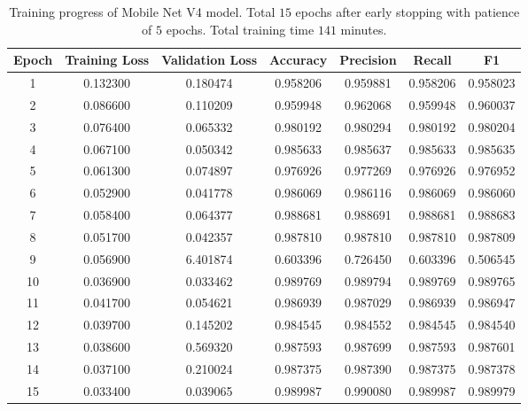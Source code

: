 \documentclass[a4paper]{article}
\begin{document}
\begin{table}[H]
    \centering
    \caption{Training progress of Mobile Net V4 model. Total $15$ epochs after early stopping with patience of $5$ epochs. Total training time $141$ minutes.}
    \label{tab:mobile_net_training_progress}
    \begin{tabular}{ccccccc}
        \toprule
        \textbf{Epoch} & \textbf{Training Loss} & \textbf{Validation Loss} & \textbf{Accuracy} & \textbf{Precision} & \textbf{Recall} & \textbf{F1} \\
        \midrule
        1  & 0.132300 & 0.180474 & 0.958206 & 0.959881 & 0.958206 & 0.958023 \\
        2  & 0.086600 & 0.110209 & 0.959948 & 0.962068 & 0.959948 & 0.960037 \\
        3  & 0.076400 & 0.065332 & 0.980192 & 0.980294 & 0.980192 & 0.980204 \\
        4  & 0.067100 & 0.050342 & 0.985633 & 0.985637 & 0.985633 & 0.985635 \\
        5  & 0.061300 & 0.074897 & 0.976926 & 0.977269 & 0.976926 & 0.976952 \\
        6  & 0.052900 & 0.041778 & 0.986069 & 0.986116 & 0.986069 & 0.986060 \\
        7  & 0.058400 & 0.064377 & 0.988681 & 0.988691 & 0.988681 & 0.988683 \\
        8  & 0.051700 & 0.042357 & 0.987810 & 0.987810 & 0.987810 & 0.987809 \\
        9  & 0.056900 & 6.401874 & 0.603396 & 0.726450 & 0.603396 & 0.506545 \\
        10 & 0.036900 & 0.033462 & 0.989769 & 0.989794 & 0.989769 & 0.989765 \\
        11 & 0.041700 & 0.054621 & 0.986939 & 0.987029 & 0.986939 & 0.986947 \\
        12 & 0.039700 & 0.145202 & 0.984545 & 0.984552 & 0.984545 & 0.984540 \\
        13 & 0.038600 & 0.569320 & 0.987593 & 0.987699 & 0.987593 & 0.987601 \\
        14 & 0.037100 & 0.210024 & 0.987375 & 0.987390 & 0.987375 & 0.987378 \\
        15 & 0.033400 & 0.039065 & 0.989987 & 0.990080 & 0.989987 & 0.989979 \\
        \bottomrule
    \end{tabular}
\end{table}
\end{document}
